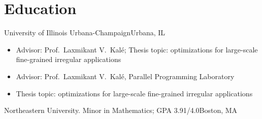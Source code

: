 \section{Education}

  {University of Illinois Urbana-Champaign}{Urbana, IL}
\begin{itemize}
\ifresume
  \item Advisor: Prof.\ Laxmikant V.\ Kalé; Thesis topic: optimizations for large-scale
    fine-grained irregular applications
\else
  \item Advisor: Prof.\ Laxmikant V.\ Kalé, Parallel Programming Laboratory
  \item Thesis topic: optimizations for large-scale fine-grained irregular applications
\fi
\end{itemize}
\entrygap

  {Northeastern University. Minor in Mathematics; GPA 3.91/4.0}{Boston, MA}
